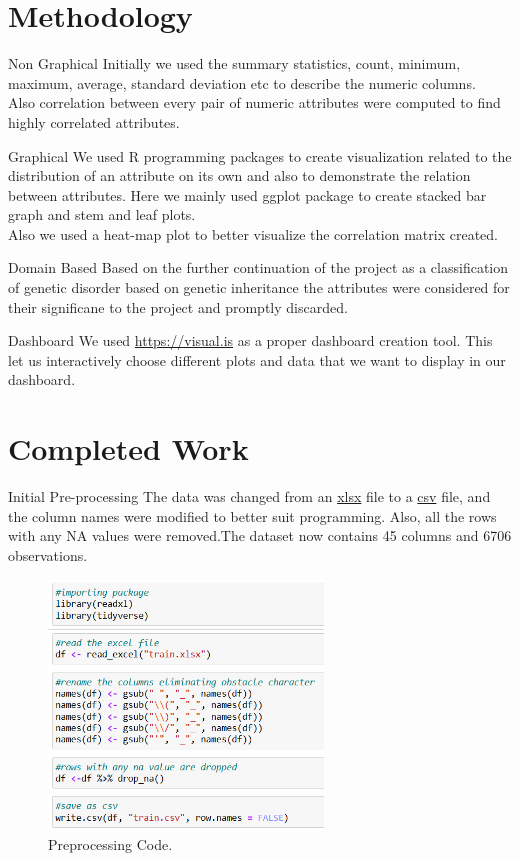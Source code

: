 \documentclass{beamer}
\begin{document}
	\section{Methodology}
	\begin{frame}{Non Graphical}
		Initially we used the summary statistics, count, minimum, maximum, average, standard deviation etc to describe the numeric columns. \\
		Also correlation between every pair of numeric attributes were computed to find highly correlated attributes.\\ 
	\end{frame}
	\begin{frame}{Graphical}
		We used R programming packages to create visualization related to the distribution of an attribute on its own and also to demonstrate the relation between attributes. Here we mainly used ggplot package to create stacked bar graph and stem and leaf plots.\\
		Also we used a heat-map plot to better visualize the correlation matrix created.
	\end{frame}
	\begin{frame}{Domain Based}
	Based on the further continuation of the project as a classification of genetic disorder based on genetic inheritance the attributes were considered for their significane to the project and promptly discarded.
	\end{frame}
	\begin{frame}{Dashboard}
		We used \url{https://visual.is} as a proper dashboard creation tool. This let us interactively choose different plots and data that we want to display in our dashboard.
	\end{frame}
	\section{Completed Work}
	\begin{frame}{Initial Pre-processing}
		The data was changed from an \underline{xlsx} file to a \underline{csv} file, and the column names were modified to better suit programming. Also, all the rows with any NA values were removed.The dataset now contains 45 columns and 6706 observations.
			\begin{figure}
				\includegraphics[width=0.65\textwidth, height=0.6\textheight]{pre.png}
				\caption{Preprocessing Code.}
			\end{figure}
		
	\end{frame}
	
\end{document}
